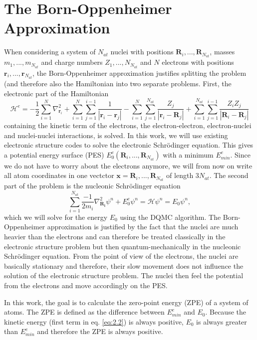 \documentclass [12pt]{report}
\begin{document}
\section{The Born-Oppenheimer Approximation}
When considering a system of $N_{at}$ nuclei with positions $\bm{R}_i,...,\bm{R}_{N_{at}}$, masses $m_1,...,m_{N_{at}}$ and charge numbers $Z_1,...,N_{N_{at}}$ and $N$ electrons with positions $\bm{r}_i,...,\bm{r}_{N_{at}}$, the Born-Oppenheimer approximation justifies splitting the problem (and therefore also the Hamiltonian into two separate problems. First, the electronic part of the Hamiltonian
\begin{equation}
\mathcal{H}^e = - \frac{1}{2}\sum_{i=1}^N \nabla^2_{\bm{r}_i}  + \sum_{i=1}^{N} \sum_{j=1}^{i-1} \frac{1}{|\bm{r}_i-\bm{r}_j|} - \sum_{i=1}^{N} \sum_{j=1}^{N_{at}} \frac{Z_j}{|\bm{r}_i-\bm{R}_j|} + \sum_{i=1}^{N_{at}} \sum_{j=1}^{i-1} \frac{Z_i Z_j}{|\bm{R}_i-\bm{R}_j|}
\end{equation}
containing the kinetic term of the electrons, the electron-electron, electron-nuclei and nuclei-nuclei interactions, is solved. In this work, we will use existing electronic structure codes to solve the electronic Schrödinger equation. This gives a potential energy surface (PES) $E_0^e(\bm{R}_i,...,\bm{R}_{N_{at}})$ with a minimum $E_{min}^e$. Since we do not have to worry about the electrons anymore, we will from now on write all atom coordinates in one vectctor $\bm{x} = \bm{R}_i,...,\bm{R}_{N_{at}}$ of length $3N_{at}$.
The second part of the problem is the nucleonic Schrödinger equation
\begin{equation} \label{eq:2.2}
\sum_{i=1}^{N_{at}} \frac{-1}{2m_i} \nabla^2_{\bm{R_i}} \psi^n + E_0^e \psi^n = \mathcal{H} \psi^n = E_0 \psi^n,
\end{equation}
which we will solve for the energy $E_0$ using the DQMC algorithm. The Born-Oppenheimer approximation is justified by the fact that the nuclei are much heavier than the electrons and can therefore be treated classically in the electronic structure problem but then quantum-mechanically in the nucleonic Schrödinger equation. From the point of view of the electrons, the nuclei are basically stationary and therefore, their slow movement does not influence the solution of the electronic structure problem. The nuclei then feel the potential from the electrons and move accordingly on the PES.

In this work, the goal is to calculate the zero-point energy (ZPE) of a system of atoms. The ZPE is defined as the difference between $E_{min}^e$ and $E_0$. Because the kinetic energy (first term in eq. \eqref{eq:2.2}) is always positive, $E_0$ is always greater than $E_{min}^e$ and therefore the ZPE is always positive.
\end{document}
